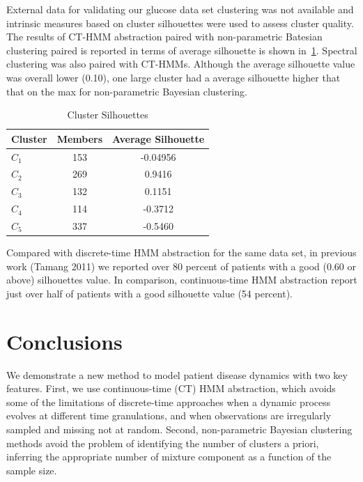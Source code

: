 \documentclass[letterpaper]{article}
\begin{document}
External data for validating our glucose data set clustering was not available and intrinsic measures based on cluster silhouettes were used to assess cluster quality.  The results of CT-HMM abstraction paired with non-parametric Batesian clustering paired is reported in terms of average silhouette is shown in~\ref{table:sil}.  Spectral clustering was also paired with CT-HMMs.  Although the average silhouette value was overall lower (0.10), one large cluster had a average silhouette higher that that on the max for non-parametric Bayesian clustering.

\begin{table}[h]
\caption{Cluster Silhouettes}
\centering
\begin{tabular}{|l|c|c|}
  \hline
   Cluster& Members & Average Silhouette  \\
   \hline
  $C_1$ & 153 & -0.04956 \\
  $C_2$ & 269 & 0.9416  \\
  $C_3$ & 132 & 0.1151  \\
  $C_4$ & 114 & -0.3712 \\
  $C_5$ & 337 & -0.5460 \\
  \hline
\end{tabular}
\label{table:sil} %
\end{table}

Compared with discrete-time HMM abstraction for the same data set, in previous work (Tamang 2011) we reported over 80 percent of patients with a good (0.60 or above) silhouettes value.  In comparison, continuous-time HMM abstraction report just over half of patients with a good silhouette value (54 percent).

\section{Conclusions}
\noindent

We demonstrate a new method to model patient disease dynamics with two key features.  First, we use continuous-time (CT) HMM abstraction, which avoids some of the limitations of discrete-time approaches when a dynamic process evolves at different time granulations, and when observations are irregularly sampled and missing not at random.  Second, non-parametric Bayesian clustering methods avoid the problem of identifying the number of clusters a priori, inferring the appropriate number of mixture component as a function of the sample size.
\end{document}
